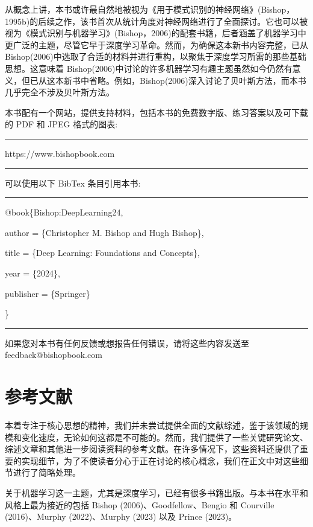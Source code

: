 \documentclass[10pt]{article}
\newcommand{\HRule}{\begin{center}\rule{0.9\linewidth}{0.2mm}\end{center}}
\begin{document}
从概念上讲，本书或许最自然地被视为《用于模式识别的神经网络》(Bishop，1995b)的后续之作，该书首次从统计角度对神经网络进行了全面探讨。它也可以被视为《模式识别与机器学习》(Bishop，2006)的配套书籍，后者涵盖了机器学习中更广泛的主题，尽管它早于深度学习革命。然而，为确保这本新书内容完整，已从 Bishop(2006)中选取了合适的材料并进行重构，以聚焦于深度学习所需的那些基础思想。这意味着 Bishop(2006)中讨论的许多机器学习有趣主题虽然如今仍然有意义，但已从这本新书中省略。例如，Bishop(2006)深入讨论了贝叶斯方法，而本书几乎完全不涉及贝叶斯方法。

本书配有一个网站，提供支持材料，包括本书的免费数字版、练习答案以及可下载的 PDF 和 JPEG 格式的图表:

\HRule

https://www.bishopbook.com

\HRule

可以使用以下 BibTex 条目引用本书:

\HRule

@book\{Bishop:DeepLearning24,

\hspace*{1em} author = \{Christopher M. Bishop and Hugh Bishop\},

\hspace*{1em} title = \{Deep Learning: Foundations and Concepts\},

\hspace*{1em} year = \{2024\},

\hspace*{1em} publisher = \{Springer\}

\}

\HRule

如果您对本书有任何反馈或想报告任何错误，请将这些内容发送至 feedback@bishopbook.com

\section*{参考文献}

本着专注于核心思想的精神，我们并未尝试提供全面的文献综述，鉴于该领域的规模和变化速度，无论如何这都是不可能的。然而，我们提供了一些关键研究论文、综述文章和其他进一步阅读资料的参考文献。在许多情况下，这些资料还提供了重要的实现细节，为了不使读者分心于正在讨论的核心概念，我们在正文中对这些细节进行了简略处理。

关于机器学习这一主题，尤其是深度学习，已经有很多书籍出版。与本书在水平和风格上最为接近的包括 Bishop (2006)、Goodfellow、Bengio 和 Courville (2016)、Murphy (2022)、Murphy (2023) 以及 Prince (2023)。
\end{document}

